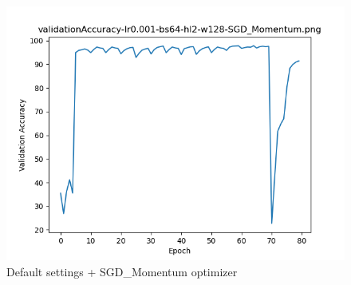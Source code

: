 \documentclass{article}[12pt]
\begin{document}
        \begin{figure}[H]
        \includegraphics[width=\linewidth]{testsResults/validationAccuracy/validationAccuracy-lr0.001-bs64-hl2-w128-SGD_Momentum.png}
        \caption{Default settings + SGD\_Momentum optimizer}
        \endminipage
    \end{figure}
\end{document}
